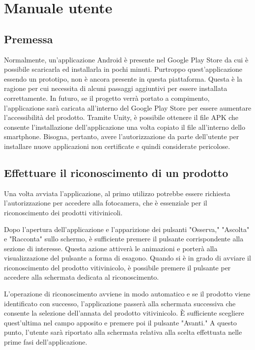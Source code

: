 \section{Manuale utente}

\subsection{Premessa}

Normalmente, un'applicazione Android è presente nel Google Play Store da cui è possibile scaricarla ed installarla in pochi minuti. Purtroppo quest'applicazione essendo un prototipo, non è ancora presente in questa piattaforma. Questa è la ragione per cui necessita di alcuni passaggi aggiuntivi per essere installata correttamente. In futuro, se il progetto verrà portato a compimento, l'applicazione sarà caricata all'interno del Google Play Store per essere aumentare l'accessibilità del prodotto. Tramite Unity, è possibile ottenere il file APK che consente l'installazione dell'applicazione una volta copiato il file all'interno dello smartphone. Bisogna, pertanto, avere l'autorizzazione da parte dell'utente per installare nuove applicazioni non certificate e quindi considerate pericolose.

\subsection{Effettuare il riconoscimento di un prodotto}

Una volta avviata l'applicazione, al primo utilizzo potrebbe essere richiesta l'autorizzazione per accedere alla fotocamera, che è essenziale per il riconoscimento dei prodotti vitivinicoli.

Dopo l'apertura dell'applicazione e l'apparizione dei pulsanti "Osserva," "Ascolta" e "Racconta" sullo schermo, è sufficiente premere il pulsante corrispondente alla sezione di interesse. Questa azione attiverà le animazioni e porterà alla visualizzazione del pulsante a forma di esagono. Quando si è in grado di avviare il riconoscimento del prodotto vitivinicolo, è possibile premere il pulsante per accedere alla schermata dedicata al riconoscimento.

L'operazione di riconoscimento avviene in modo automatico e se il prodotto viene identificato con successo, l'applicazione passerà alla schermata successiva che consente la selezione dell'annata del prodotto vitivinicolo. È sufficiente scegliere quest'ultima nel campo apposito e premere poi il pulsante "Avanti." A questo punto, l'utente sarà riportato alla schermata relativa alla scelta effettuata nelle prime fasi dell'applicazione.

